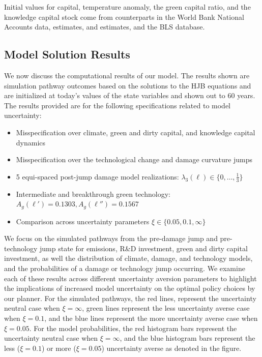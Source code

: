 \documentclass[12pt]{article}
\begin{document}
Initial values for capital, temperature anomaly, the green capital ratio, and the knowledge capital stock come from counterparts in the World Bank National Accounts data, \cite{IPCC:2021} estimates, \cite{fried2021macro, dhar2022investor, carattini2023climate} and \cite{berk2025impact} estimates, and the BLS database. %


\subsection{Model Solution Results}

We now discuss the computational results of our model. The results shown are simulation pathway outcomes based on the solutions to the HJB equations and are initialized at today's values of the state variables and shown out to 60 years. The results provided are for the following specifications related to model uncertainty:

\begin{itemize}
\item Misspecification over climate, green and dirty capital, and knowledge capital dynamics
\item Misspecification over the technological change and damage curvature jumps
\item 5 equi-spaced post-jump damage model realizations: $\lambda_3(\ell) \in \{0, \ldots, \frac{1}{3} \}$
\item Intermediate and breakthrough green technology: $A_g(\ell') = 0.1303, A_g(\ell'') = 0.1567$
\item Comparison across uncertainty parameters $ \xi \in \{0.05, 0.1, \infty \}$ 
\end{itemize}

\vspace{0.25cm} 





We focus on the simulated pathways from the pre-damage jump and pre-technology jump state for emissions, R\&D investment, green and dirty capital investment, as well the distribution of climate, damage, and technology models, and the probabilities of a damage or technology jump occurring. We examine each of these results across different uncertainty aversion parameters to highlight the implications of increased model uncertainty on the optimal policy choices by our planner. For the simulated pathways, the red lines, represent the uncertainty neutral case when $\xi = \infty$, green lines represent the less uncertainty averse case when $\xi = 0.1$, and the blue lines represent the more uncertainty averse case when $\xi = 0.05$. For the model probabilities, the red histogram bars represent the uncertainty neutral case when $\xi = \infty$, and the blue histogram bars represent the less ($\xi = 0.1$) or more ($\xi = 0.05$) uncertainty averse as denoted in the figure. 
\end{document}

